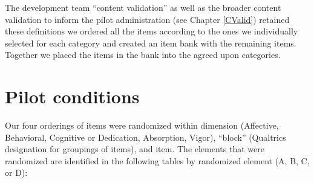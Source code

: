 \documentclass[
]{book}
\begin{document}
The development team ``content validation'' as well as the broader content validation to inform the pilot administration (see Chapter \ref{CValid}) retained these definitions we ordered all the items according to the ones we individually selected for each category and created an item bank with the remaining items. Together we placed the items in the bank into the agreed upon categories.

\hypertarget{pilot2}{%
\chapter{Pilot conditions}\label{pilot2}}

Our four orderings of items were randomized within dimension (Affective, Behavioral, Cognitive or Dedication, Absorption, Vigor), ``block'' (Qualtrics designation for groupings of items), and item. The elements that were randomized are identified in the following tables by randomized element (A, B, C, or D):
\end{document}
